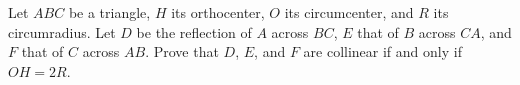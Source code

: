 Let $ABC$ be a triangle, $H$ its orthocenter, $O$ its circumcenter, and $R$ its circumradius. Let $D$ be the reflection of $A$ across $BC$, $E$ that of $B$ across $CA$, and $F$ that of $C$ across $AB$. Prove that $D$, $E$, and $F$ are collinear if and only if $OH = 2R$.
